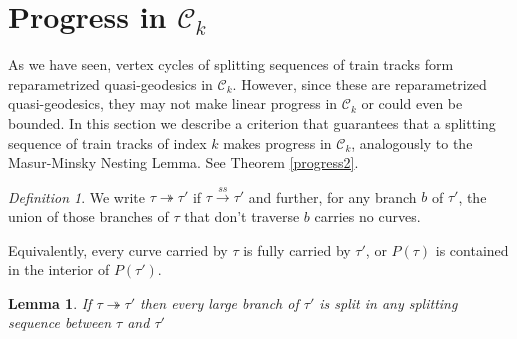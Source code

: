 \documentclass[11pt]{article}
\newtheorem{lemma}[thm]{Lemma}
\theoremstyle{remark}
\newtheorem{definition}[thm]{Definition}
\def\C{{\mathcal C}}
\def\ss{{\overset{ss}\longrightarrow}}
\begin{document}
\section{Progress in $\C_k$}
\label{sec:progress}

As we have seen, vertex cycles of splitting sequences of train tracks form
reparametrized quasi-geodesics in $\C_k$. However, since these
are reparametrized quasi-geodesics, they may not make linear progress in $\C_k$
or could even be bounded.
In this section we describe a criterion that guarantees that a splitting
sequence of train tracks of index $k$ makes progress in $\C_k$,
analogously to the Masur-Minsky Nesting Lemma. See Theorem
\ref{progress2}. 

\begin{definition}
  We write $\tau\twoheadrightarrow\tau'$ if $\tau\ss\tau'$ and
  further, for any branch $b$ of $\tau'$,
  the union of those branches of
  $\tau$ that don't traverse $b$ carries no curves.
\end{definition}

Equivalently, every curve carried by $\tau$ is fully carried by $\tau'$, or $P(\tau)$ is contained in the interior of $P(\tau')$.

\newcommand{\tac}{{(\textasteriskcentered)}}
\begin{lemma}\label{allsplit}
If $\tau\twoheadrightarrow\tau'$ then every large branch of $\tau'$ is split in any splitting sequence between $\tau$ and $\tau'$
\end{lemma}
\end{document}
